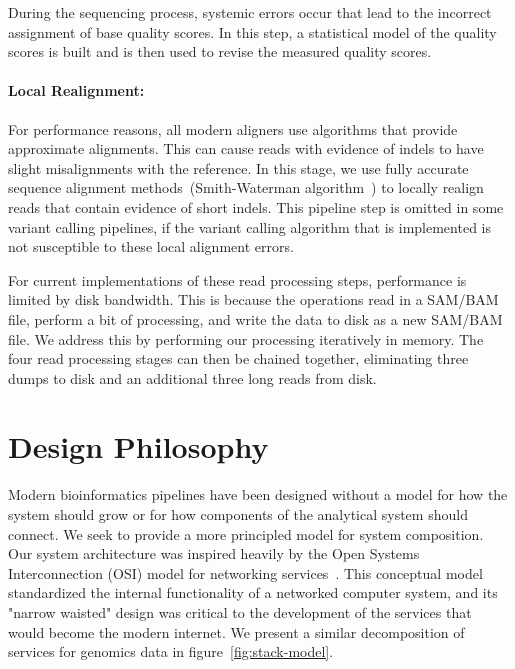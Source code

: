 \documentclass[10pt,twocolumn]{article}
\begin{document}
During the sequencing process, systemic errors occur that lead to the incorrect assignment of base quality scores. In this step, a
statistical model of the quality scores is built and is then used to revise the measured quality scores.

\paragraph{Local Realignment:} 
\label{sec:local-realignment}

For performance reasons, all modern aligners use algorithms that provide approximate alignments. This can cause reads with
evidence of indels to have slight misalignments with the reference. In this stage, we use fully accurate sequence alignment
methods~(Smith-Waterman algorithm~\cite{smith81}) to locally realign reads that contain evidence of short indels. This pipeline
step is omitted in some variant calling pipelines, if the variant calling algorithm that is implemented is not susceptible to these
local alignment errors.

For current implementations of these read processing steps, performance is limited by disk bandwidth. This is because the operations
read in a SAM/BAM file, perform a bit of processing, and write the data to disk as a new SAM/BAM file. We address this by performing
our processing iteratively in memory. The four read processing stages can then be chained together, eliminating three dumps to
disk and an additional three long reads from disk. 

\section{Design Philosophy}
\label{sec:design-philosophy}

Modern bioinformatics pipelines have been designed without a model for how the system should grow or for how
components of the analytical system should connect. We seek to provide a more principled model for system composition.
Our system architecture was inspired heavily by the Open Systems Interconnection (OSI) model for networking
services~\cite{zimmermann80}. This conceptual model standardized the internal functionality of a networked
computer system, and its "narrow waisted" design was critical to the development of the services that would
become the modern internet. We present a similar decomposition of services for genomics data in
figure~\ref{fig:stack-model}.
\end{document}

